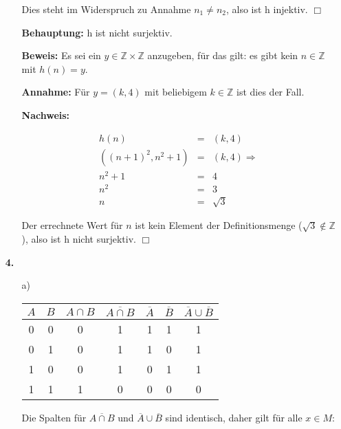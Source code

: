 \documentclass[a4paper]{scrartcl}
\begin{document}
\begin{enumerate}
\begin{enumerate}
                Dies steht im Widerspruch zu Annahme $n_1 \not= n_2$, also ist h injektiv. $\Box$
                
                \textbf{Behauptung:} h ist nicht surjektiv.
                
                \textbf{Beweis:} Es sei ein $y \in \mathbb{Z} \times \mathbb{Z}$ anzugeben, für das gilt: 
                es gibt kein $n \in \mathbb{Z}$ mit $h(n) = y$.
                
                \textbf{Annahme:} Für $y = (k, 4)$ mit beliebigem $k \in \mathbb{Z}$ ist dies der Fall.
                
                \textbf{Nachweis:}
                
                $$\begin{array}{rcl}
                    h(n) &=& (k, 4)\\
                    ((n + 1)^2, n^2 + 1) &=& (k, 4) \Rightarrow \\
                    n^2 + 1 &=& 4\\
                    n^2 &=& 3\\
                    n &=& \sqrt{3}
                \end{array}$$
                
                Der errechnete Wert für $n$ ist kein Element der Definitionsmenge ($\sqrt{3} \notin \mathbb{Z}$), also ist h nicht surjektiv. $\Box$
        \end{enumerate}
        
    \item[\textbf{4.}]
        \begin{enumerate}
            \item[a)]
                \begin{tabular}[t]{c|c||c|c|c|c|c}
                    $A$ & $B$ & $A \cap B$ & $\overline{A \cap B}$ & $\overline{A}$ & $\overline{B}$ & $\overline{A} \cup \overline{B}$ \\
                    \hline
                    0 & 0 & 0 & 1 & 1 & 1 & 1\\
                    0 & 1 & 0 & 1 & 1 & 0 & 1\\
                    1 & 0 & 0 & 1 & 0 & 1 & 1\\
                    1 & 1 & 1 & 0 & 0 & 0 & 0
                \end{tabular}

                Die Spalten für $\overline{A \cap B}$ und $\overline{A} \cup \overline{B}$ sind identisch, daher gilt für alle $x \in M$:
                

\end{enumerate}
\end{enumerate}
\end{document}
